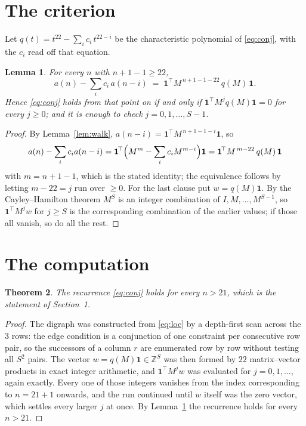 \documentclass[11pt,a4paper]{article}
\theoremstyle{plain}
\newtheorem{theorem}{Theorem}
\newtheorem{lemma}[theorem]{Lemma}
\theoremstyle{definition}
\begin{document}
\section{The criterion}

Let $q(t)=t^{22}-\sum_i c_i\,t^{22-i}$ be the characteristic polynomial of
\eqref{eq:conj}, with the $c_i$ read off that equation.

\begin{lemma}\label{lem:crit}
For every $n$ with $n+1-1\ge22$,
\[
a(n)-\sum_i c_i\,a(n-i)\;=\;\mathbf{1}^{\!\top}M^{\,n+1-1-22}\,q(M)\,\mathbf{1} .
\]
Hence \eqref{eq:conj} holds from that point on if and only if
$\mathbf{1}^{\!\top}M^{j}q(M)\mathbf{1}=0$ for every $j\ge0$; and it is enough to check
$j=0,1,\dots,S-1$.
\end{lemma}

\begin{proof}
By Lemma~\ref{lem:walk}, $a(n-i)=\mathbf{1}^{\!\top}M^{\,n+1-1-i}\mathbf{1}$, so
\[
a(n)-\sum_i c_i a(n-i)
=\mathbf{1}^{\!\top}\Bigl(M^{m}-\sum_i c_i M^{m-i}\Bigr)\mathbf{1}
=\mathbf{1}^{\!\top}M^{\,m-22}\,q(M)\,\mathbf{1}
\]
with $m=n+1-1$, which is the stated identity; the equivalence follows by letting
$m-22=j$ run over $\ge0$. For the last clause put $w=q(M)\mathbf{1}$. By the
Cayley--Hamilton theorem $M^{S}$ is an integer combination of $I,M,\dots,M^{S-1}$, so
$\mathbf{1}^{\!\top}M^{j}w$ for $j\ge S$ is the corresponding combination of the earlier
values; if those all vanish, so do all the rest.
\end{proof}

\section{The computation}

\begin{theorem}
The recurrence \eqref{eq:conj} holds for every $n>21$, which is the statement of
Section~1.
\end{theorem}

\begin{proof}
The digraph was constructed from \eqref{eq:loc} by a depth-first scan across the $3$
rows: the edge condition is a conjunction of one constraint per consecutive row
pair, so the successors of a column $r$ are enumerated row by row without testing all
$S^2$ pairs. The vector $w=q(M)\mathbf{1}\in\mathbb{Z}^{S}$ was then formed by $22$
matrix--vector products in exact integer arithmetic, and $\mathbf{1}^{\!\top}M^{j}w$ was
evaluated for $j=0,1,\dots$, again exactly. Every one of those integers vanishes from the
index corresponding to $n=21+1$ onwards, and the run continued until $w$ itself was the
zero vector, which settles every larger $j$ at once. By Lemma~\ref{lem:crit} the recurrence
holds for every $n>21$.
\end{proof}
\end{document}
